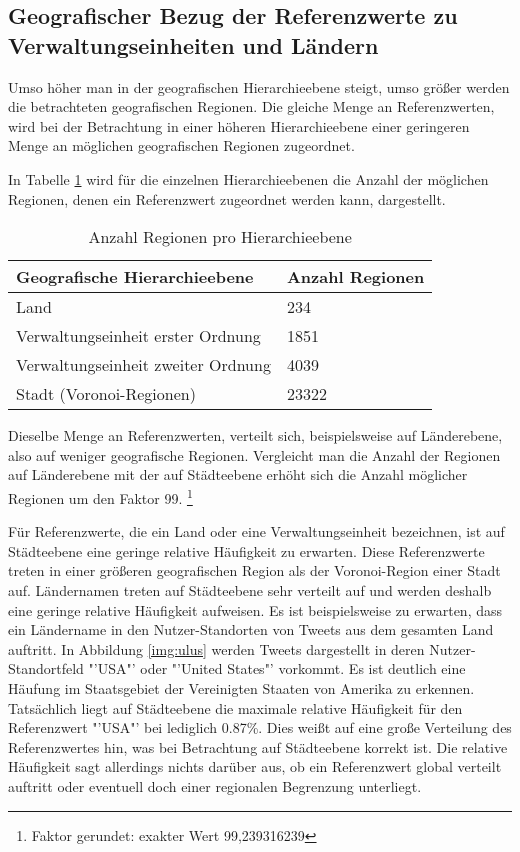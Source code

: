 		\subsection{Geografischer Bezug der Referenzwerte zu Verwaltungseinheiten und Ländern} 

			Umso höher man in der geografischen Hierarchieebene steigt, umso größer werden die betrachteten geografischen Regionen.
			Die gleiche Menge an Referenzwerten, wird bei der Betrachtung in einer höheren Hierarchieebene einer geringeren Menge an möglichen geografischen Regionen zugeordnet.
			
			In Tabelle \ref{tab:AnzahlRegionen} wird für die einzelnen Hierarchieebenen die Anzahl der möglichen Regionen, denen ein Referenzwert zugeordnet werden kann, dargestellt.
			
			\begin{table}[h]
			\centering
			\begin{tabular}{|l|l|}
			\hline
			\textbf{Geografische Hierarchieebene} & \textbf{Anzahl Regionen} \\ \hline
			Land                                  & 234                      \\ \hline
			Verwaltungseinheit erster Ordnung     & 1851                     \\ \hline
			Verwaltungseinheit zweiter Ordnung    & 4039                     \\ \hline
			Stadt (Voronoi-Regionen)              & 23322                    \\ \hline
			\end{tabular}
			\caption{Anzahl Regionen pro Hierarchieebene}
			\label{tab:AnzahlRegionen}
			\end{table}

			Dieselbe Menge an Referenzwerten, verteilt sich, beispielsweise auf Länderebene, also auf weniger geografische Regionen. 
			Vergleicht man die Anzahl der Regionen auf Länderebene mit der auf Städteebene erhöht sich die Anzahl möglicher Regionen um den Faktor 99. \footnote{Faktor gerundet: exakter Wert 99,239316239}

			Für Referenzwerte, die ein Land oder eine Verwaltungseinheit bezeichnen, ist auf Städteebene eine geringe relative Häufigkeit zu erwarten.
			Diese Referenzwerte treten in einer größeren geografischen Region als der Voronoi-Region einer Stadt auf.
			Ländernamen treten auf Städteebene sehr verteilt auf und werden deshalb eine geringe relative Häufigkeit aufweisen.
			Es ist beispielsweise zu erwarten, dass ein Ländername in den Nutzer-Standorten von Tweets aus dem gesamten Land auftritt.
			In Abbildung \ref{img:ulus} werden Tweets dargestellt in deren Nutzer-Standortfeld "'USA"' oder "'United States"' vorkommt.
			Es ist deutlich eine Häufung im Staatsgebiet der Vereinigten Staaten von Amerika zu erkennen.
			Tatsächlich liegt auf Städteebene die maximale relative Häufigkeit für den Referenzwert "'USA"' bei lediglich 0.87\%.   
			Dies weißt auf eine große Verteilung des Referenzwertes hin, was bei Betrachtung auf Städteebene korrekt ist.
			Die relative Häufigkeit sagt allerdings nichts darüber aus, ob ein Referenzwert global verteilt auftritt oder eventuell doch einer regionalen Begrenzung unterliegt. 

